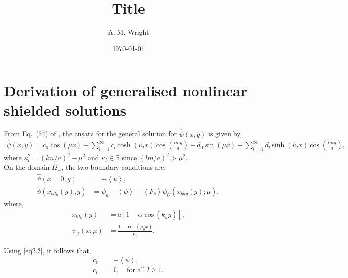 \documentclass[aip,graphicx]{revtex4-1}
\newcommand{\lr}[1]{\left(#1\right)}
\newcommand{\lrsq}[1]{\left[ #1 \right]}
\newcommand{\lra}[1]{\left\langle #1 \right\rangle}
\newcommand{\psih}{\hat{\psi}}
\newcommand{\xbdy}{x_{bdy}(y)}
\newcommand{\reals}{\mathbb{R}}
\newcommand{\muo}{\mu_{0}}
\begin{document}

\title{Title}

\author{A. M. Wright}

\date{\today}




\section*{Derivation of generalised nonlinear shielded solutions}\label{sec:2}


From Eq.\ (64) of \citet{dewar2017}, the ansatz for the general solution for $\psih(x,y)$ is given by,
\begin{align}
\psih(x,y)=c_0 \cos\lr{\mu x} + \sum_{l=1}^{\infty}c_l\cosh\lr{\kappa_l x}\cos\lr{\frac{lmy}{a}}+d_0\sin\lr{\mu x}+\sum_{l=1}^{\infty}d_l\sinh\lr{\kappa_l x}\cos\lr{\frac{lmy}{a}},\label{eq2.1}
\end{align}
where $\kappa^2_l=\lr{lm/a}^2-\mu^2$ and $\kappa_l\in\reals$ since $\lr{lm/a}^2>\mu^2$.\\

On the domain $\Omega_{+}$, the two boundary conditions are,
	\begin{align}
	\psih(x=0,y)&=-\lra{\psi},\label{eq2.2}\\
	\psih(\xbdy,y)&=\psi_a-\lra{\psi}-\lra{F_0}\psi_U\lr{\xbdy;\mu}, \label{eq2.3}
	\end{align}
	where,
	\begin{align}
	\xbdy&=a\lrsq{1-\alpha\cos\lr{k_y y}}, \label{eq2.4}\\
	\psi_U(x;\mu)&=\frac{1-\cos\lr{\muo x}}{\muo}. \label{eq2.5}
	\end{align}
	
Using \eqref{eq2.2}, it follows that,
	\begin{align}
	c_0&=-\lra{\psi},\label{eq2.6}\\
	c_l&=0, \quad\text{for all }l\geq1.\label{eq2.7}
	\end{align}
	
\end{document}
